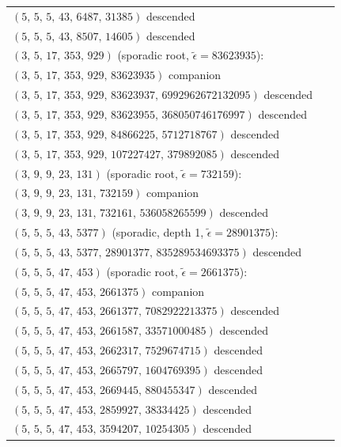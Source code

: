 \documentclass[11pt]{article}
\theoremstyle{definition}
\theoremstyle{remark}
\newcommand{\eps}{\tilde{\epsilon}}
\begin{document}
\begin{longtable}{@{}p{0.95\linewidth}@{}}
\quad $(5,\,5,\,5,\,43,\,6487,\,31385)$ \hfill {\small descended} \\
\quad $(5,\,5,\,5,\,43,\,8507,\,14605)$ \hfill {\small descended} \\
\addlinespace
\textbf{$(3,\,5,\,17,\,353,\,929)$} \quad (sporadic root, $\eps = 83623935$): \\
\quad $(3,\,5,\,17,\,353,\,929,\,83623935)$ \hfill {\small companion} \\
\quad $(3,\,5,\,17,\,353,\,929,\,83623937,\,6992962672132095)$ \hfill {\small descended} \\
\quad $(3,\,5,\,17,\,353,\,929,\,83623955,\,368050746176997)$ \hfill {\small descended} \\
\quad $(3,\,5,\,17,\,353,\,929,\,84866225,\,5712718767)$ \hfill {\small descended} \\
\quad $(3,\,5,\,17,\,353,\,929,\,107227427,\,379892085)$ \hfill {\small descended} \\
\addlinespace
\textbf{$(3,\,9,\,9,\,23,\,131)$} \quad (sporadic root, $\eps = 732159$): \\
\quad $(3,\,9,\,9,\,23,\,131,\,732159)$ \hfill {\small companion} \\
\quad $(3,\,9,\,9,\,23,\,131,\,732161,\,536058265599)$ \hfill {\small descended} \\
\addlinespace
\textbf{$(5,\,5,\,5,\,43,\,5377)$} \quad (sporadic, depth 1, $\eps = 28901375$): \\
\quad $(5,\,5,\,5,\,43,\,5377,\,28901377,\,835289534693375)$ \hfill {\small descended} \\
\addlinespace
\textbf{$(5,\,5,\,5,\,47,\,453)$} \quad (sporadic root, $\eps = 2661375$): \\
\quad $(5,\,5,\,5,\,47,\,453,\,2661375)$ \hfill {\small companion} \\
\quad $(5,\,5,\,5,\,47,\,453,\,2661377,\,7082922213375)$ \hfill {\small descended} \\
\quad $(5,\,5,\,5,\,47,\,453,\,2661587,\,33571000485)$ \hfill {\small descended} \\
\quad $(5,\,5,\,5,\,47,\,453,\,2662317,\,7529674715)$ \hfill {\small descended} \\
\quad $(5,\,5,\,5,\,47,\,453,\,2665797,\,1604769395)$ \hfill {\small descended} \\
\quad $(5,\,5,\,5,\,47,\,453,\,2669445,\,880455347)$ \hfill {\small descended} \\
\quad $(5,\,5,\,5,\,47,\,453,\,2859927,\,38334425)$ \hfill {\small descended} \\
\quad $(5,\,5,\,5,\,47,\,453,\,3594207,\,10254305)$ \hfill {\small descended} \\

\end{longtable}
\end{document}

